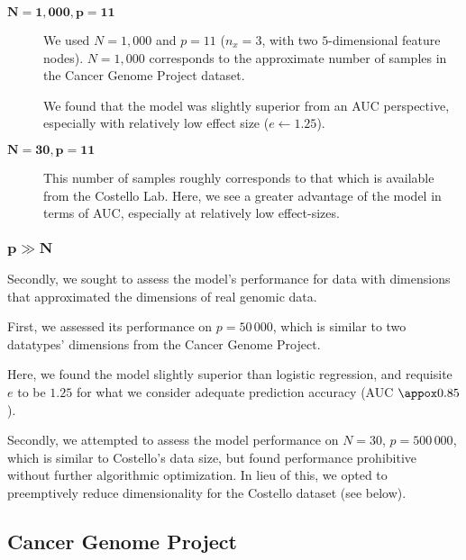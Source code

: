 \begin{description}
\item[$\mathbf{N=1,000, p=11}$] We used $N=1,000$ and $p=11$ ($n_x = 3$, with
  two $5$-dimensional feature nodes). $N=1,000$ corresponds to the
  approximate number of samples in the Cancer Genome
  Project\cite{ledford_end_2015} dataset.

  We found that the model was slightly superior from an AUC
  perspective, especially with relatively low effect size
  ($e \leftarrow 1.25$). 
  
\item[$\mathbf{N=30,p=11}$] This number of samples roughly corresponds to that
  which is available from the Costello Lab. Here, we see a greater
  advantage of the model in terms of AUC, especially at relatively low
  effect-sizes. 
\end{description}

\subsubsection{$\mathbf{p \gg N}$}

Secondly, we sought to assess the model's performance for data with dimensions that approximated the dimensions of real genomic data.

First, we assessed its performance on $p = 50\,000$, which is similar to two datatypes' dimensions from the Cancer Genome Project.

Here, we found the model slightly superior than logistic regression, and requisite $e$ to be $1.25$ for what we consider adequate prediction accuracy (AUC $\appox 0.85$). 


Secondly, we attempted to assess the model performance on  $N = 30$, $p = 500\,000$, which is similar to Costello's data size, but found performance prohibitive without further algorithmic optimization. In lieu of this, we opted to preemptively reduce dimensionality for the Costello dataset (see below).

\subsection{Cancer Genome Project}






